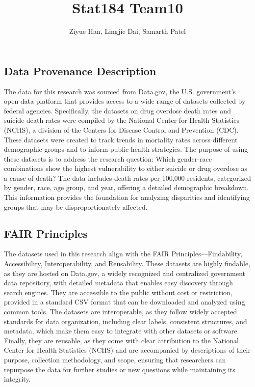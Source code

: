 \documentclass[
  letterpaper,
  DIV=11,
  numbers=noendperiod]{scrartcl}
\title{Stat184 Team10}
\author{Ziyue Han, Lingjie Dai, Samarth Patel}
\date{}
\begin{document}
\maketitle

\subsection{Data Provenance
Description}\label{data-provenance-description}

The data for this research was sourced from Data.gov, the U.S.
government's open data platform that provides access to a wide range of
datasets collected by federal agencies. Specifically, the datasets on
drug overdose death rates and suicide death rates were compiled by the
National Center for Health Statistics (NCHS), a division of the Centers
for Disease Control and Prevention (CDC). These datasets were created to
track trends in mortality rates across different demographic groups and
to inform public health strategies. The purpose of using these datasets
is to address the research question: Which gender-race combinations show
the highest vulnerability to either suicide or drug overdose as a cause
of death? The data includes death rates per 100,000 residents,
categorized by gender, race, age group, and year, offering a detailed
demographic breakdown. This information provides the foundation for
analyzing disparities and identifying groups that may be
disproportionately affected.

\subsection{FAIR Principles}\label{fair-principles}

The datasets used in this research align with the FAIR
Principles---Findability, Accessibility, Interoperability, and
Reusability. These datasets are highly findable, as they are hosted on
Data.gov, a widely recognized and centralized government data
repository, with detailed metadata that enables easy discovery through
search engines. They are accessible to the public without cost or
restriction, provided in a standard CSV format that can be downloaded
and analyzed using common tools. The datasets are interoperable, as they
follow widely accepted standards for data organization, including clear
labels, consistent structures, and metadata, which make them easy to
integrate with other datasets or software. Finally, they are reusable,
as they come with clear attribution to the National Center for Health
Statistics (NCHS) and are accompanied by descriptions of their purpose,
collection methodology, and scope, ensuring that researchers can
repurpose the data for further studies or new questions while
maintaining its integrity.
\end{document}
